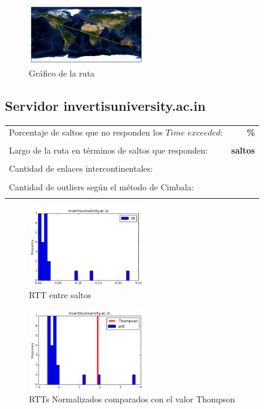 \begin{figure}[H]
  \centering
    \includegraphics[width=0.45\textwidth]{grafico-rutas/auckland-ac-nz.png}
  \caption{Gráfico de la ruta}
  \label{entropia-s}
\end{figure}




\subsection{Servidor invertisuniversity.ac.in}

\begin{center}
\begin{tabular}{p{6.5cm}r}
Porcentaje de saltos que no responden los $Time$ $exceeded$: & \textbf{\%} \\ \\ 
Largo de la ruta en términos de saltos que responden: &\textbf{ saltos} \\ \\
Cantidad de enlaces intercontinentales: & \textbf{} \\ \\
Cantidad de outliers según el método de Cimbala: & \textbf{} \\ \\
\end{tabular}
\end{center}

\begin{figure}[H]
  \centering
    \includegraphics[width=0.45\textwidth]{histogramas_rtt/invertisuniversity-ac-in.png}
  \caption{RTT entre saltos}
  \label{entropia-s}
\end{figure}

\begin{figure}[H]
  \centering
    \includegraphics[width=0.45\textwidth]{histogramas_thompson/invertisuniversity-ac-in.png}
  \caption{RTTs Normalizados comparados con el valor Thompson}
  \label{entropia-s}
\end{figure}

